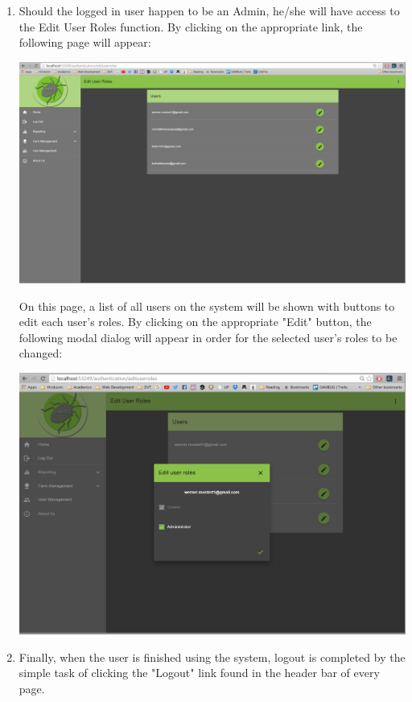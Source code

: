\documentclass[11pt,a4paper,titlepage]{article}
\begin{document}
\begin{enumerate}
\item Should the logged in user happen to be an Admin, he/she will have access to the Edit User Roles function. By clicking on the appropriate link, the following page will appear: 
	\begin{center}
		\includegraphics[width=\linewidth]{edituserroles.png}
	\end{center}
	On this page, a list of all users on the system will be shown with buttons to edit each user's roles. By clicking on the appropriate "Edit" button, the following modal dialog will appear in order for the selected user's roles to be changed:
		\begin{center}
			\includegraphics[width=\linewidth]{edituserrole.png} %
		\end{center}
\item Finally, when the user is finished using the system, logout is completed by the simple task of clicking the "Logout" link found in the header bar of every page.
	\end{enumerate}
\end{document}
